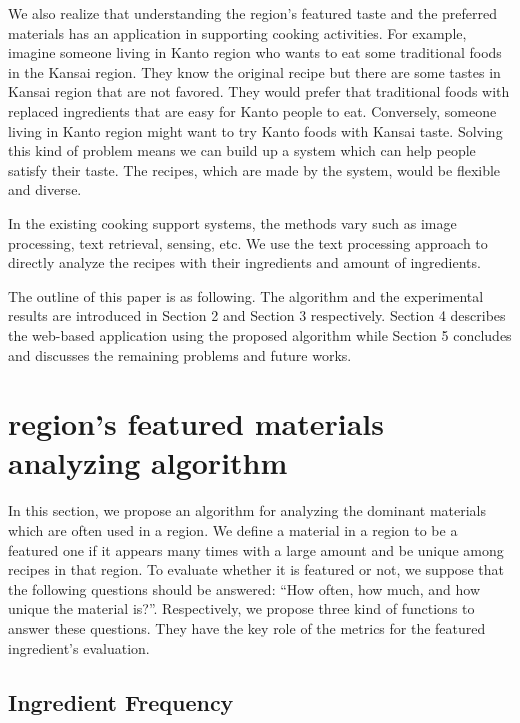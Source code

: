 \documentclass{sig-alternate}
\begin{document}
\par We also realize that understanding the region's featured taste and the preferred materials has an application in supporting cooking activities. For example, imagine someone living in Kanto region who wants to eat some traditional foods in the Kansai region. They know the original recipe but there are some tastes in Kansai region that are not favored. They would prefer that traditional foods with replaced ingredients that are easy for Kanto people to eat. Conversely, someone living in Kanto region might want to try Kanto foods with Kansai taste. Solving this kind of problem means we can build up a system which can help people satisfy their taste. The recipes, which are made by the system, would be flexible and diverse.
\par In the existing cooking support systems, the methods vary such as image processing, text retrieval, sensing, etc. We use the text processing approach to directly analyze the recipes with their ingredients and amount of ingredients. 
\par The outline of this paper is as following. The algorithm and the experimental results are introduced in Section 2 and Section 3 respectively. Section 4 describes the web-based application using the proposed algorithm while Section 5 concludes and discusses the remaining problems and future works. 
 
 
\section{region's featured materials analyzing algorithm}

In this section, we propose an algorithm for analyzing the dominant materials which are often used in a region. We define a material in a region to be a featured one if it appears many times with a large amount and be unique among recipes in that region. To evaluate whether it is featured or not, we suppose that the following questions should be answered: ``How often, how much, and how unique the material is?''. Respectively, we propose three kind of functions to answer these questions. They have the key role of the metrics for the featured ingredient's evaluation.  

\subsection{Ingredient Frequency}
\end{document}
